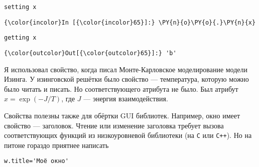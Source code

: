     \begin{Verbatim}[commandchars=\\\{\}]
setting x

    \end{Verbatim}

    \begin{Verbatim}[commandchars=\\\{\}]
{\color{incolor}In [{\color{incolor}65}]:} \PY{n}{o}\PY{o}{.}\PY{n}{x}
\end{Verbatim}

    \begin{Verbatim}[commandchars=\\\{\}]
getting x

    \end{Verbatim}

            \begin{Verbatim}[commandchars=\\\{\}]
{\color{outcolor}Out[{\color{outcolor}65}]:} 'b'
\end{Verbatim}
        
    Я использовал свойство, когда писал Монте-Карловское моделирование
модели Изинга. У изинговской решётки было свойство --- температура,
которую можно было читать и писать. Но соответствующего атрибута не
было. Был атрибут \(x=\exp(-J/T)\), где \(J\) --- энергия взаимодействия.

Свойства полезны также для обёртки GUI библиотек. Например, окно имеет
свойство --- заголовок. Чтение или изменение заголовка требует вызова
соответствующих функций из низкоуровневой библиотеки (на \texttt{C} или
\texttt{C++}). Но на питоне гораздо приятнее написать

\begin{verbatim}
w.title='Моё окно'
\end{verbatim}
